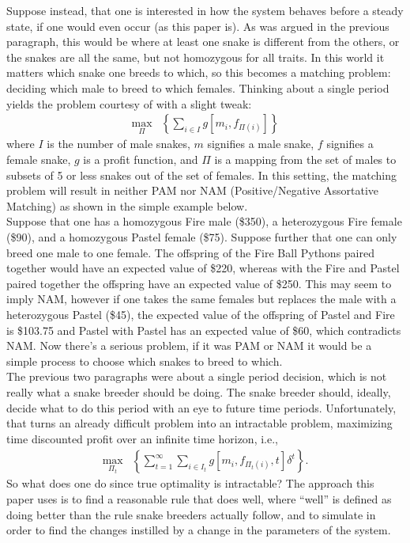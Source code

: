 \documentclass{article}
\begin{document}
	\indent Suppose instead, that one is interested in how the system behaves before a steady state, if one would even occur (as this paper is). As was argued in the previous paragraph, this would be where at least one snake is different from the others, or the snakes are all the same, but not homozygous for all traits. In this world it matters which snake one breeds to which, so this becomes a matching  problem: deciding which male to breed to which females. Thinking about a single period yields the problem courtesy of \cite{becker} with a slight tweak:
	\begin{align*}
		\max_{\Pi}&\left\{ \sum_{i\in I}g\left[m_i,f_{\Pi(i)}\right] \right\}
	\end{align*}
	where $I$ is the number of male snakes, $m$ signifies a male snake, $f$ signifies a female snake, $g$ is a profit function, and $\Pi$ is a mapping from the set of males to subsets of 5 or less snakes out of the set of females. In this setting, the matching problem will result in neither PAM nor NAM (Positive/Negative Assortative Matching) as shown in the simple example below.\\
	\indent Suppose that one has a homozygous Fire male (\$350), a heterozygous Fire female (\$90), and a homozygous Pastel female (\$75). Suppose further that one can only breed one male to one female. The offspring of the Fire Ball Pythons paired together would have an expected value of \$220, whereas with the Fire and Pastel paired together the offspring have an expected value of \$250. This may seem to imply NAM, however if one takes the same females but replaces the male with a heterozygous Pastel (\$45), the expected value of the offspring of Pastel and Fire is \$103.75 and Pastel with Pastel has an expected value of \$60, which contradicts NAM. Now there's a serious problem, if it was PAM or NAM it would be a simple process to choose which snakes to breed to which.\\
	\indent The previous two paragraphs were about a single period decision, which is not really what a snake breeder should be doing. The snake breeder should, ideally, decide what to do this period with an eye to future time periods. Unfortunately, that turns an already difficult problem into an intractable problem, maximizing time discounted profit over an infinite time horizon, i.e.,
	\begin{align*}
		\max_{\Pi_t}&\left\{ \sum_{t=1}^{\infty}\sum_{i\in I_t}g\left[m_i,f_{\Pi_t(i)},t\right]\delta^t \right\}.
	\end{align*}
	\indent So what does one do since true optimality is intractable? The approach this paper uses is to find a reasonable rule that does well, where ``well'' is defined as doing better than the rule snake breeders actually follow, and to simulate in order to find the changes instilled by a change in the parameters of the system.
\end{document}
